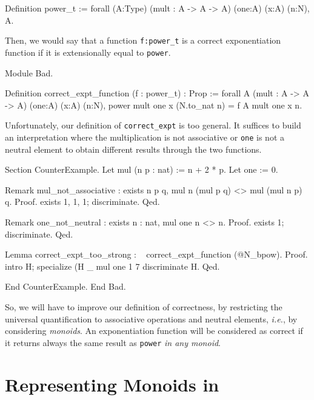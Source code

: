 \begin{Coqsrc}
Definition power_t := forall (A:Type)
                             (mult : A -> A -> A)
                             (one:A)
                             (x:A)
                             (n:N), A.
\end{Coqsrc}

Then, we would say that a function \texttt{f:power\_t} is a correct exponentiation function if it
is extensionally equal to \texttt{power}.

\begin{Coqbad}
Module Bad.

 Definition correct_expt_function (f : power_t) : Prop :=
  forall A (mult : A -> A -> A) (one:A)
            (x:A) (n:N), 
            power mult one x (N.to_nat n) = f A mult one x n.
\end{Coqbad}


Unfortunately, our definition of \texttt{correct\_expt} is too general. It suffices to build 
an interpretation where the multiplication is not associative or \texttt{one} is not a neutral
element to obtain different results through the two functions.



\begin{Coqbad}
Section CounterExample.
    Let mul (n p : nat) := n + 2 * p.
    Let one := 0.

    Remark mul_not_associative :
      exists  n p q,  mul n (mul p q) <> mul (mul n p) q.
    Proof. 
        exists 1, 1, 1; discriminate. 
    Qed.

    Remark one_not_neutral  :
      exists n : nat, mul one n <> n.
    Proof.
      exists 1; discriminate.
    Qed.

    Lemma correct_expt_too_strong : 
          ~ correct_expt_function (@N_bpow).
    Proof.
      intro H; specialize (H _ mul one 1  7%
      discriminate H.    
    Qed.

End CounterExample.
End Bad.
 \end{Coqbad}


So, we will have to improve our definition of correctness, by restricting  the universal quantification to associative operations and neutral elements, \emph{i.e.}, by considering \emph{monoids}.
An exponentiation  function will be considered as correct if it returns always the same result as \texttt{power} \emph{in any monoid}.



\section{Representing Monoids in \coq \label{monoid-class-def}}


